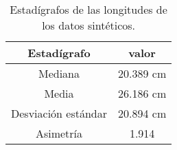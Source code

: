 \begin{table}[H]
	\centering
	\begin{tabular}{ |c|c|}
		\hline
		Estad\'igrafo         & valor  \\ \hline\hline
		Mediana             & 20.389 cm \\ \hline
		Media               & 26.186 cm \\ \hline
		Desviaci\'on est\'andar & 20.894 cm \\ \hline
		Asimetr\'ia           & 1.914  \\ \hline
	\end{tabular}
	\caption{Estad\'igrafos de las longitudes de los datos sint\'eticos.}
	\label{t:lengthStats}
\end{table}

